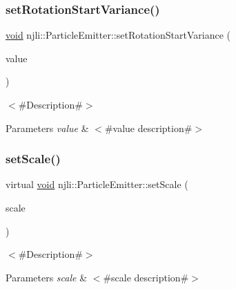 \subsubsection{\texorpdfstring{set\+Rotation\+Start\+Variance()}{setRotationStartVariance()}}
{\footnotesize\ttfamily \mbox{\hyperlink{_thread_8h_af1e856da2e658414cb2456cb6f7ebc66}{void}} njli\+::\+Particle\+Emitter\+::set\+Rotation\+Start\+Variance (\begin{DoxyParamCaption}\item[{const \mbox{\hyperlink{_util_8h_a5f6906312a689f27d70e9d086649d3fd}{f32}} \&}]{value }\end{DoxyParamCaption})}

$<$\#\+Description\#$>$


\begin{DoxyParams}{Parameters}
{\em value} & $<$\#value description\#$>$ \\
\hline
\end{DoxyParams}
\mbox{\label{classnjli_1_1_particle_emitter_ac709de0745b9ccf90a2d681d9e49c1a3}} 
\subsubsection{\texorpdfstring{set\+Scale()}{setScale()}\hspace{0.1cm}{\footnotesize\ttfamily [1/2]}}
{\footnotesize\ttfamily virtual \mbox{\hyperlink{_thread_8h_af1e856da2e658414cb2456cb6f7ebc66}{void}} njli\+::\+Particle\+Emitter\+::set\+Scale (\begin{DoxyParamCaption}\item[{const bt\+Vector3 \&}]{scale }\end{DoxyParamCaption})\hspace{0.3cm}{\ttfamily [virtual]}}

$<$\#\+Description\#$>$


\begin{DoxyParams}{Parameters}
{\em scale} & $<$\#scale description\#$>$ \\
\hline
\end{DoxyParams}
\mbox{\label{classnjli_1_1_particle_emitter_a06720872c8a4b3fd17d8771887ed30b3}} 
